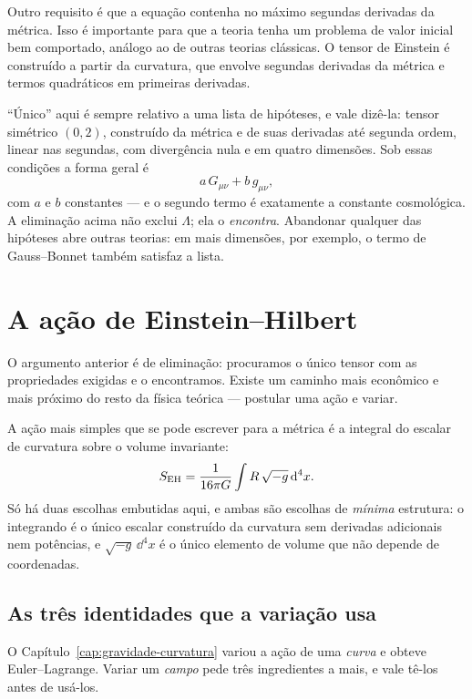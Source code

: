 \documentclass[12pt,a4paper,oneside]{book}
\theoremstyle{rgplain}
\theoremstyle{rgremark}
\begin{document}
Outro requisito é que a equação contenha no máximo segundas derivadas da
métrica. Isso é importante para que a teoria tenha um problema de valor inicial
bem comportado, análogo ao de outras teorias clássicas. O tensor de Einstein é
construído a partir da curvatura, que envolve segundas derivadas da métrica e
termos quadráticos em primeiras derivadas.

\begin{atencao}
``Único'' aqui é sempre relativo a uma lista de hipóteses, e vale dizê-la:
tensor simétrico $(0,2)$, construído da métrica e de suas derivadas até
segunda ordem, linear nas segundas, com divergência nula e em quatro
dimensões. Sob essas condições a forma geral é
\[
  a\,G_{\mu\nu}+b\,g_{\mu\nu} ,
\]
com $a$ e $b$ constantes --- e o segundo termo é exatamente a constante
cosmológica. A eliminação acima não exclui $\Lambda$; ela o \emph{encontra}.
Abandonar qualquer das hipóteses abre outras teorias: em mais dimensões, por
exemplo, o termo de Gauss--Bonnet também satisfaz a lista.
\end{atencao}

\section{A ação de Einstein--Hilbert}
\label{sec:acao-hilbert}

O argumento anterior é de eliminação: procuramos o único tensor com as
propriedades exigidas e o encontramos. Existe um caminho mais econômico e
mais próximo do resto da física teórica --- postular uma ação e variar.

A ação mais simples que se pode escrever para a métrica é a integral do
escalar de curvatura sobre o volume invariante:
\begin{equation}
  S_{\rm EH}=\frac{1}{16\pi G}\int R\,\sqrt{-g}\,\mathrm{d}^4x .
  \label{eq:acao-hilbert}
\end{equation}
Só há duas escolhas embutidas aqui, e ambas são escolhas de \emph{mínima}
estrutura: o integrando é o único escalar construído da curvatura sem
derivadas adicionais nem potências, e $\sqrt{-g}\,\dd^4x$ é o único elemento
de volume que não depende de coordenadas.

\subsection*{As três identidades que a variação usa}

O Capítulo~\ref{cap:gravidade-curvatura} variou a ação de uma \emph{curva} e
obteve Euler--Lagrange. Variar um \emph{campo} pede três ingredientes a mais,
e vale tê-los antes de usá-los.
\end{document}
